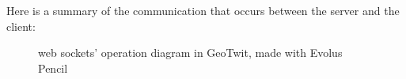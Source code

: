 \documentclass[a4paper,11pt]{report}
\begin{document}
Here is a summary of the communication that occurs between the server and the client:
\begin{figure}[H]
\vspace{-5pt}
\begin{center}
\vspace{-5pt}
\caption{web sockets' operation diagram in GeoTwit, made with Evolus Pencil}
\end{center}
\end{figure}
\end{document}
